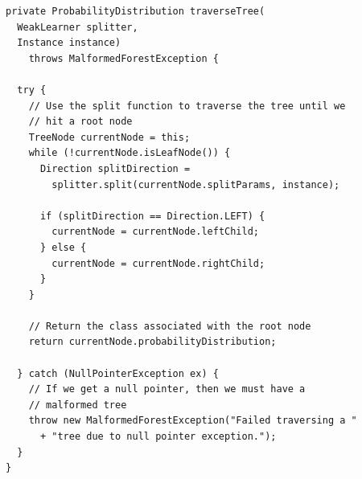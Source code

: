 \documentclass[12pt,twoside,notitlepage]{report}
\begin{document}
    \begin{lstlisting}[float=tp,caption={The implementation code for tree traversal.}, label={lst:actualTraverseTree}]
private ProbabilityDistribution traverseTree(
  WeakLearner splitter, 
  Instance instance) 
    throws MalformedForestException {

  try {
    // Use the split function to traverse the tree until we 
    // hit a root node
    TreeNode currentNode = this;
    while (!currentNode.isLeafNode()) {
      Direction splitDirection = 
        splitter.split(currentNode.splitParams, instance);

      if (splitDirection == Direction.LEFT) {
        currentNode = currentNode.leftChild;
      } else {
        currentNode = currentNode.rightChild;
      }
    }
    
    // Return the class associated with the root node
    return currentNode.probabilityDistribution;
    
  } catch (NullPointerException ex) {
    // If we get a null pointer, then we must have a 
    // malformed tree
    throw new MalformedForestException("Failed traversing a "
      + "tree due to null pointer exception.");
  }
}
    \end{lstlisting}
\end{document}
